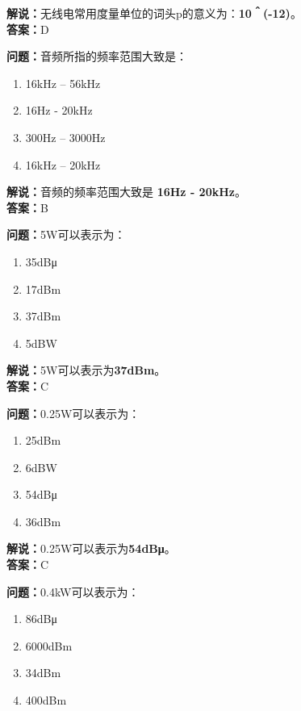 \textbf{解说：}无线电常用度量单位的词头p的意义为：\textbf{10＾(-12)}。\\\textbf{答案：}D



\textbf{问题：}音频所指的频率范围大致是：

\begin{enumerate}[label=\Alph*), leftmargin=1.5cm]
	\item 16kHz – 56kHz
	\item 16Hz - 20kHz
	\item 300Hz – 3000Hz
	\item 16kHz – 20kHz
\end{enumerate}

\textbf{解说：}音频的频率范围大致是 \textbf{16Hz - 20kHz}。\\\textbf{答案：}B%



\textbf{问题：}5W可以表示为：

\begin{enumerate}[label=\Alph*), leftmargin=1.5cm]
	\item 35dBμ
	\item 17dBm
	\item 37dBm
	\item 5dBW
\end{enumerate}

\textbf{解说：}5W可以表示为\textbf{37dBm}。\\\textbf{答案：}C %



\textbf{问题：}0.25W可以表示为：

\begin{enumerate}[label=\Alph*), leftmargin=1.5cm]
	\item 25dBm
	\item 6dBW
	\item 54dBμ
	\item 36dBm
\end{enumerate}

\textbf{解说：}0.25W可以表示为\textbf{54dBμ}。\\\textbf{答案：}C%



\textbf{问题：}0.4kW可以表示为：

\begin{enumerate}[label=\Alph*), leftmargin=1.5cm]
	\item 86dBμ
	\item 6000dBm
	\item 34dBm
	\item 400dBm
\end{enumerate}

